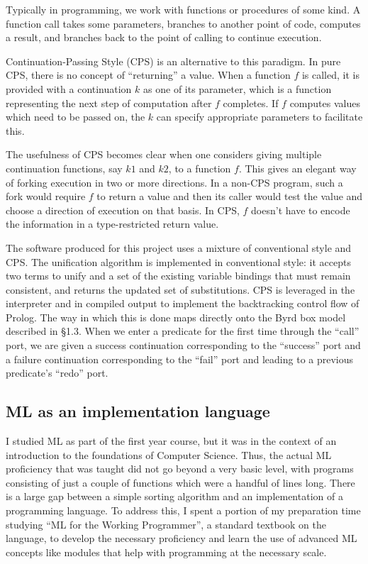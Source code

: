 \documentclass[12pt]{article}
\begin{document}
Typically in programming, we work with functions or procedures of some kind. 
A function call takes some parameters, branches to another point of code, computes a result, and branches back to the point of calling to continue execution.

Continuation-Passing Style (CPS) is an alternative to this paradigm. 
In pure CPS, there is no concept of ``returning'' a value. 
When a function $f$ is called, it is provided with a continuation $k$ as one of its parameter, which is a function representing the next step of computation after $f$ completes. 
If $f$ computes values which need to be passed on, the $k$ can specify appropriate parameters to facilitate this.

The usefulness of CPS becomes clear when one considers giving multiple continuation functions, say $k1$ and $k2$, to a function $f$. 
This gives an elegant way of forking execution in two or more directions. 
In a non-CPS program, such a fork would require $f$ to return a value and then its caller would test the value and choose a direction of execution on that basis. 
In CPS, $f$ doesn't have to encode the information in a type-restricted return value.

The software produced for this project uses a mixture of conventional style and CPS. 
The unification algorithm is implemented in conventional style: it accepts two terms to unify and a set of the existing variable bindings that must remain consistent, and returns the updated set of substitutions. 
CPS is leveraged in the interpreter and in compiled output to implement the backtracking control flow of Prolog.
The way in which this is done maps directly onto the Byrd box model described in \S1.3. When we enter a predicate for the first time through the ``call'' port, we are given a success continuation corresponding to the ``success'' port and a failure continuation corresponding to the ``fail'' port and leading to a previous predicate's ``redo'' port.

\subsection{ML as an implementation language}

I studied ML as part of the first year course, but it was in the context of an introduction to the foundations of Computer Science. 
Thus, the actual ML proficiency that was taught did not go beyond a very basic level, with programs consisting of just a couple of functions which were a handful of lines long. 
There is a large gap between a simple sorting algorithm and an implementation of a programming language. 
To address this, I spent a portion of my preparation time studying ``ML for the Working Programmer'', a standard textbook on the language, to develop the necessary proficiency and learn the use of advanced ML concepts like modules that help with programming at the necessary scale.
\end{document}
